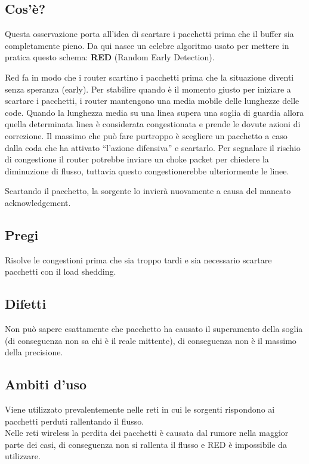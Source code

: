 \subsection{Cos'è?}
Questa osservazione porta all’idea di scartare i pacchetti prima che il buffer sia completamente pieno. Da qui nasce un celebre algoritmo usato per mettere in pratica questo schema: \textbf{RED} (Random Early Detection).

Red fa in modo che i router scartino i pacchetti prima che la situazione diventi senza speranza (early). Per stabilire quando è il momento giusto per iniziare a scartare i pacchetti, i router mantengono una media mobile delle lunghezze delle code. Quando la lunghezza media su una linea supera una soglia di guardia allora quella determinata linea è considerata congestionata e prende le dovute azioni di correzione. Il massimo che può fare purtroppo è scegliere un pacchetto a caso dalla coda che ha attivato “l’azione difensiva” e scartarlo. Per segnalare il rischio di congestione il router potrebbe inviare un choke packet per chiedere la diminuzione di flusso, tuttavia questo congestionerebbe ulteriormente le linee.

Scartando il pacchetto, la sorgente lo invierà nuovamente a causa del mancato acknowledgement.

\subsection{Pregi}
Risolve le congestioni prima che sia troppo tardi e sia necessario scartare pacchetti con il load shedding.

\subsection{Difetti}
Non può sapere esattamente che pacchetto ha causato il superamento della soglia (di conseguenza non sa chi è il reale mittente), di conseguenza non è il massimo della precisione.

\subsection{Ambiti d'uso}
Viene utilizzato prevalentemente nelle reti in cui le sorgenti rispondono ai pacchetti perduti rallentando il flusso.\\
Nelle reti wireless la perdita dei pacchetti è causata dal rumore nella maggior parte dei casi, di conseguenza non si rallenta il flusso e RED è impossibile da utilizzare.

